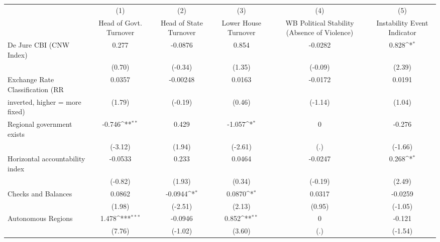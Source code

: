{
\def\sym#1{\ifmmode^{#1}\else\(^{#1}\)\fi}
\begin{tabular}{l*{5}{c}}
\toprule
                                        &\multicolumn{1}{c}{(1)}&\multicolumn{1}{c}{(2)}&\multicolumn{1}{c}{(3)}&\multicolumn{1}{c}{(4)}&\multicolumn{1}{c}{(5)}\\
                                        &\multicolumn{1}{c}{Head of Govt. Turnover}&\multicolumn{1}{c}{Head of State Turnover}&\multicolumn{1}{c}{Lower House Turnover}&\multicolumn{1}{c}{WB Political Stability (Absence of Violence)}&\multicolumn{1}{c}{Instability Event Indicator}\\
\midrule
De Jure CBI (CNW Index)                 &0.277         &-0.0876         &0.854         &-0.0282         &0.828\sym{*}  \\
                                        &(0.70)         &(-0.34)         &(1.35)         &(-0.09)         &(2.39)         \\
\addlinespace
Exchange Rate Classification (RR        &0.0357         &-0.00248         &0.0163         &-0.0172         &0.0191         \\
inverted, higher = more fixed)          &(1.79)         &(-0.19)         &(0.46)         &(-1.14)         &(1.04)         \\
\addlinespace
Regional government exists              &-0.746\sym{**} &0.429         &-1.057\sym{*}  &    0         &-0.276         \\
                                        &(-3.12)         &(1.94)         &(-2.61)         &  (.)         &(-1.66)         \\
\addlinespace
Horizontal accountability index         &-0.0533         &0.233         &0.0464         &-0.0247         &0.268\sym{*}  \\
                                        &(-0.82)         &(1.93)         &(0.34)         &(-0.19)         &(2.49)         \\
\addlinespace
Checks and Balances                     &0.0862         &-0.0944\sym{*}  &0.0870\sym{*}  &0.0317         &-0.0259         \\
                                        &(1.98)         &(-2.51)         &(2.13)         &(0.95)         &(-1.05)         \\
\addlinespace
Autonomous Regions                      &1.478\sym{***}&-0.0946         &0.852\sym{**} &    0         &-0.121         \\
                                        &(7.76)         &(-1.02)         &(3.60)         &  (.)         &(-1.54)         \\

\end{tabular}}
